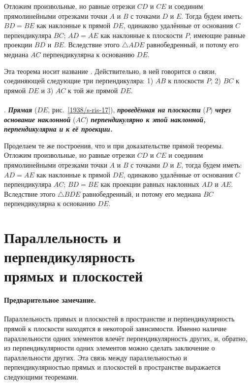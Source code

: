 Отложим произвольные, но равные отрезки $CD$ и $CE$ и соединим прямолинейными отрезками точки $A$ и $B$ с точками $D$ и $E$.
Тогда будем иметь: $BD=BE$ как наклонные к прямой $DE$, одинаково удалённые от основания $C$ перпендикуляра $BC$;
$AD=AE$ как наклонные к плоскости $P$, имеющие равные проекции $BD$ и $BE$.
Вследствие этого $\triangle ADE$ равнобедренный, и потому его медиана $AC$ перпендикулярна к основанию $DE$.

Эта теорема носит название .
Действительно, в ней говорится о связи, соединяющей следующие три перпендикуляра: 1) $AB$ к плоскости $P$, 2) $BC$ к прямой $DE$ и 3) $AC$ к той же прямой $DE$.


\paragraph{}\label{1938/s29}
.
\textbf{\emph{Прямая}} ($DE$, рис.~\ref{1938/s-ris-17}), \textbf{\emph{проведённая на плоскости}} ($P$) \textbf{\emph{через основание наклонной}} ($AC$) \textbf{\emph{перпендикулярно к этой наклонной, перпендикулярна и к её проекции.}}

Проделаем те же построения, что и при доказательстве прямой теоремы.
Отложим произвольные, но равные отрезки $CD$ и $CE$ и соединим прямолинейными отрезками точки $A$ и $B$ с точками $D$ и $E$, тогда будем иметь: $AD=AE$ как наклонные к прямой $DE$, одинаково удалённые от основания $C$ перпендикуляра $AC$;
$BD=BE$ как проекции равных наклонных $AD$ и $AE$.
Вследствие этого $\triangle BDE$ равнобедренный, и потому его медиана $BC$ перпендикулярна к основанию $DE$.



\section[Параллельность и перпендикулярность]{Параллельность и перпендикулярность\\ прямых и плоскостей}


\paragraph{Предварительное замечание.}\label{1938/s30}
Параллельность прямых и плоскостей в пространстве и перпендикулярность прямой к плоскости находятся в некоторой зависимости.
Именно наличие параллельности одних элементов влечёт перпендикулярность других, и, обратно, из перпендикулярности одних элементов можно сделать заключение о параллельности других.
Эта связь между параллельностью и перпендикулярностью прямых и плоскостей в пространстве выражается следующими теоремами.

